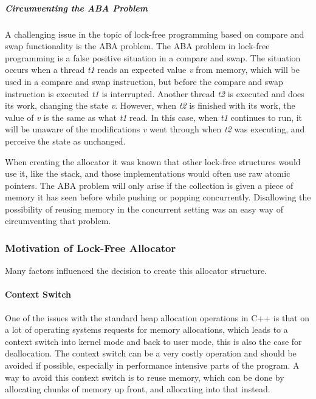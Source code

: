 \subparagraph{Circumventing the ABA Problem}
\label{subpar:detailed_lock_free_allocator_aba}
A challenging issue in the topic of lock-free programming based on compare and swap functionality is the ABA problem.
The ABA problem in lock-free programming is a false positive situation in a compare and swap\cite{understanding_and_preventing_aba_problem}.
The situation occurs when a thread \textit{t1} reads an expected value \textit{v} from memory,
which will be used in a compare and swap instruction, but before
the compare and swap instruction is executed \textit{t1} is interrupted.
Another thread \textit{t2} is executed and does its work, changing the state \textit{v}.
However, when \textit{t2} is finished with its work, the value of \textit{v} is the same as what \textit{t1} read.
In this case, when \textit{t1} continues to run, it will be unaware of the modifications \textit{v} went through
when \textit{t2} was executing, and perceive the state as unchanged.

When creating the allocator it was known that other lock-free structures would use it, like the stack, and those implementations would often use raw atomic pointers.
The ABA problem will only arise if the collection is given a piece of memory it has seen before while pushing or popping concurrently.
Disallowing the possibility of reusing memory in the concurrent setting was an easy way of circumventing that problem.

\subsubsection{Motivation of Lock-Free Allocator}
Many factors influenced the decision to create this allocator structure.

\paragraph{Context Switch}
One of the issues with the standard heap allocation operations in C++ is that on a lot of operating systems requests for memory allocations, which leads to a context switch into
kernel mode and back to user mode, this is also the case for deallocation.
The context switch can be a very costly operation and should be avoided if possible, especially in performance intensive parts of the program\cite[p. 240]{game_engine_architecture}.
A way to avoid this context switch is to reuse memory, which can be done by allocating
chunks of memory up front, and allocating into that instead.



